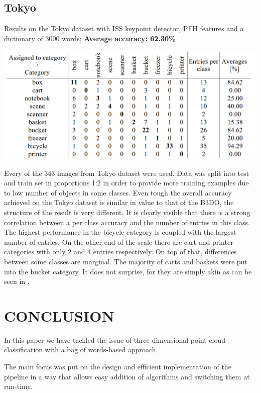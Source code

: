 \documentclass[11pt,twoside]{article}
\begin{document}
  \subsection{Tokyo}
    \begin{table}[!ht]
    \centering
    \caption{Results on the Tokyo dataset with ISS keypoint detector, PFH features and a dictionary of 3000 words; \textbf{Average accuracy: 62.30\%}}
    \includegraphics[width=1\textwidth]{../figs/tokyo_conf_matrix}	
    \label{tab:tokyo_conf_matrix}
    \end{table}

    Every of the 343 images from Tokyo dataset were used. Data was split into test and train set in proportions 1:2 in order to provide more training examples due to low number of objects in some classes. Even tough the overall accuracy achieved on the Tokyo dataset is similar in value to that of the B3DO, the structure of the result is very different. It is clearly visible that there is a strong correlation between a per class accuracy and the number of entries in this class. The highest performance in the bicycle category is coupled with the largest number of entries. On the other end of the scale there are cart and printer categories with only 2 and 4 entries respectively. On top of that, differences between some classes are marginal. The majority of carts and baskets were put into the bucket category. It does not surprise, for they are simply akin as can be seen in .

\section{ CONCLUSION }

  In this paper we have tackled the issue of three dimensional point cloud classification with a bag of words-based approach. 
  
  The main focus was put on the design and efficient implementation of the pipeline in a way that allows easy addition of algorithms and switching them at run-time.
  
\end{document}
